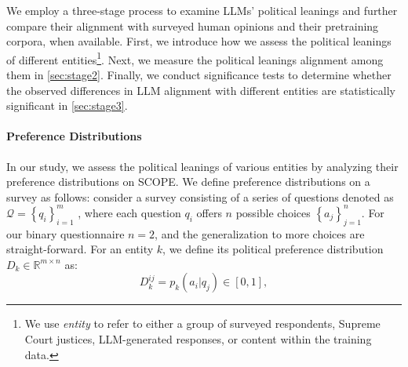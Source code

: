 We employ a three-stage process to examine LLMs' political leanings and further compare their alignment with surveyed human opinions and their pretraining corpora, when available. First, we introduce how we assess the political leanings of different entities\footnote{We use \textit{entity} to refer to either a group of surveyed respondents, Supreme Court justices, LLM-generated responses, or content within the training data.}. Next, we measure the political leanings alignment among them in \autoref{sec:stage2}. Finally, we conduct significance tests to determine whether the observed differences in LLM alignment with different entities are statistically significant in \autoref{sec:stage3}.


\paragraph{Preference Distributions} In our study, we assess the political leanings of various entities by analyzing their preference distributions on SCOPE. We define preference distributions on a survey as follows: consider a survey consisting of a series of questions denoted as $\mathcal{Q}=\left\{q_i\right\}_{i=1}^m$
, where each question $q_i$ offers $n$ possible choices $\left\{a_j\right\}_{j=1}^n$. For our binary questionnaire $n=2$, and the generalization to more choices are straight-forward.
For an entity $k$, we define its political preference distribution $D_k\in\mathbb{R}^{m\times n}$  as:
$$
D_k^{ij} =p_k(a_i|q_j)\in [0,1],
$$


